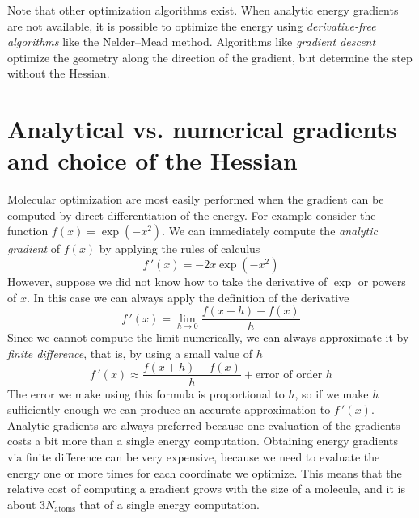 \documentclass[../Main/notes.tex]{subfiles}
\begin{document}
Note that other optimization algorithms exist.
When analytic energy gradients are not available, it is possible to optimize the energy using \emph{derivative-free algorithms} like the Nelder--Mead method.
Algorithms like \emph{gradient descent} optimize the geometry along the direction of the gradient, but determine the step without the Hessian.

\section{Analytical vs. numerical gradients and choice of the Hessian}
Molecular optimization are most easily performed when the gradient can be computed by direct differentiation of the energy.
For example consider the function $f(x) = \exp(-x^2)$.
We can immediately compute the \emph{analytic gradient} of $f(x)$ by applying the rules of calculus
\begin{equation}
f\,'(x) = -2 x \exp(-x^2)
\end{equation}
However, suppose we did not know how to take the derivative of $\exp$ or powers of $x$. In this case we can always apply the definition of the derivative
\begin{equation}
f\,'(x) = \lim_{h \rightarrow 0} \frac{f(x + h) - f(x)}{h}
\end{equation}
Since we cannot compute the limit numerically, we can always approximate it by \emph{finite difference}, that is, by using a small value of $h$
\begin{equation}
f\,'(x) \approx \frac{f(x + h) - f(x)}{h} + \text{error of order } h
\end{equation}
The error we make using this formula is proportional to $h$, so if we make $h$ sufficiently enough we can produce an accurate approximation to $f\,'(x)$.
Analytic gradients are always preferred because one evaluation of the gradients costs a bit more than a single energy computation.
Obtaining energy gradients via finite difference can be very expensive, because we need to evaluate the energy one or more times for each  coordinate we optimize. This means that the relative cost of computing a gradient grows with the size of a molecule, and it is about 3$N_\mathrm{atoms}$ that of a single energy computation.
\end{document}
